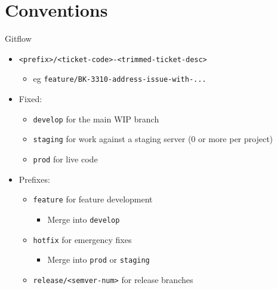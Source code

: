\documentclass[presentation]{beamer}
\begin{document}
\section{Conventions}
\label{sec:org7ae5110}
\begin{frame}[label={sec:org9e0f29a},fragile]{Gitflow}
 \begin{itemize}
\item \texttt{<prefix>/<ticket-code>-<trimmed-ticket-desc>}
\begin{itemize}
\item eg \texttt{feature/BK-3310-address-issue-with-...}
\end{itemize}
\item Fixed:
\begin{itemize}
\item \texttt{develop} for the main WIP branch
\item \texttt{staging} for work against a staging server (0 or more per project)
\item \texttt{prod} for live code
\end{itemize}
\item Prefixes:
\begin{itemize}
\item \texttt{feature} for feature development
\begin{itemize}
\item Merge into \texttt{develop}
\end{itemize}
\item \texttt{hotfix} for emergency fixes
\begin{itemize}
\item Merge into \texttt{prod} or \texttt{staging}
\end{itemize}
\item \texttt{release/<semver-num>} for release branches
\end{itemize}
\end{itemize}

\end{frame}
\end{document}
